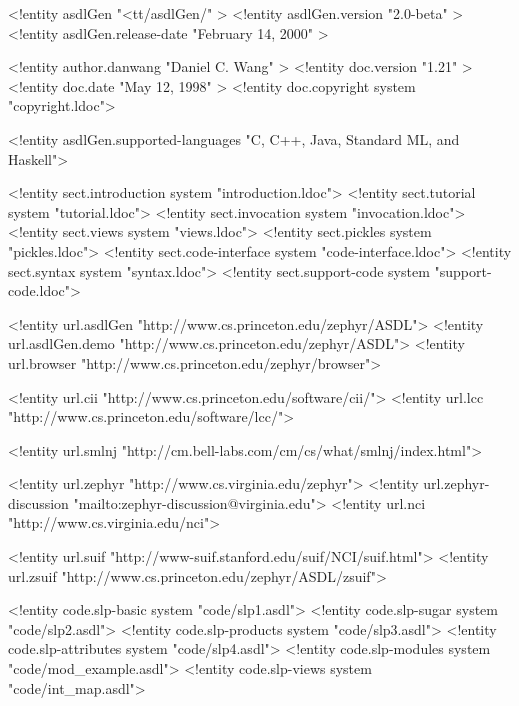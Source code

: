<!entity asdlGen "<tt/asdlGen/" >
<!entity asdlGen.version "2.0-beta" >
<!entity asdlGen.release-date "February 14, 2000" >

<!entity author.danwang "Daniel C. Wang" >
<!entity doc.version "1.21" >
<!entity doc.date "May 12, 1998" >
<!entity doc.copyright system "copyright.ldoc">

<!entity asdlGen.supported-languages 
"C, C++, Java, Standard ML, and Haskell">

<!entity sect.introduction system "introduction.ldoc">
<!entity sect.tutorial system "tutorial.ldoc">
<!entity sect.invocation system "invocation.ldoc">
<!entity sect.views system "views.ldoc">
<!entity sect.pickles system "pickles.ldoc">
<!entity sect.code-interface system "code-interface.ldoc">
<!entity sect.syntax system "syntax.ldoc">
<!entity sect.support-code system "support-code.ldoc">


<!entity url.asdlGen "http://www.cs.princeton.edu/zephyr/ASDL">
<!entity url.asdlGen.demo "http://www.cs.princeton.edu/zephyr/ASDL">
<!entity url.browser "http://www.cs.princeton.edu/zephyr/browser">

<!entity url.cii     "http://www.cs.princeton.edu/software/cii/">
<!entity url.lcc     "http://www.cs.princeton.edu/software/lcc/">

<!entity url.smlnj   "http://cm.bell-labs.com/cm/cs/what/smlnj/index.html">

<!entity url.zephyr  "http://www.cs.virginia.edu/zephyr">
<!entity url.zephyr-discussion  "mailto:zephyr-discussion@virginia.edu">
<!entity url.nci     "http://www.cs.virginia.edu/nci">

<!entity url.suif    "http://www-suif.stanford.edu/suif/NCI/suif.html">
<!entity url.zsuif    "http://www.cs.princeton.edu/zephyr/ASDL/zsuif">

<!entity code.slp-basic      system "code/slp1.asdl">
<!entity code.slp-sugar      system "code/slp2.asdl">
<!entity code.slp-products   system "code/slp3.asdl">
<!entity code.slp-attributes system "code/slp4.asdl">
<!entity code.slp-modules    system "code/mod_example.asdl"> 
<!entity code.slp-views      system "code/int_map.asdl"> 